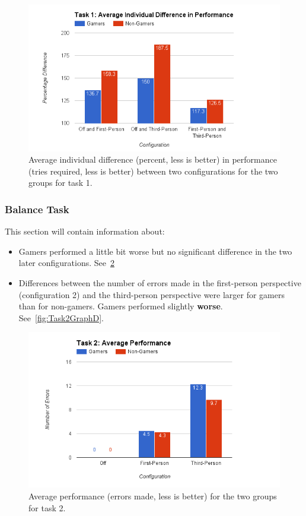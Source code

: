 \documentclass[runningheads,a4paper,oribibl]{llncs}
\begin{document}
\begin{figure}
   \centering
   \includegraphics[width=\textwidth]{ExternalMaterial/Task1GraphD}
   \caption{Average individual difference (percent, less is better) in performance (tries required, less is better) between two configurations for the two groups for task 1.} \label{fig:Task1GraphD}
\end{figure}




\subsubsection{Balance Task}
This section will contain information about:
\begin{itemize}
	\item Gamers performed a little bit worse but no significant difference in the two later configurations. See~\ref{fig:Task2GraphP}
	\item Differences between the number of errors made in the first-person perspective (configuration 2) and the third-person perspective were larger for gamers than for non-gamers. Gamers performed slightly \textbf{worse}. See~\ref{fig:Task2GraphD}.
\end{itemize}

\begin{figure}
   \centering
   \includegraphics[width=\textwidth]{ExternalMaterial/Task2GraphP}
   \caption{Average performance (errors made, less is better) for the two groups for task 2.} \label{fig:Task2GraphP}
\end{figure}
\end{document}

